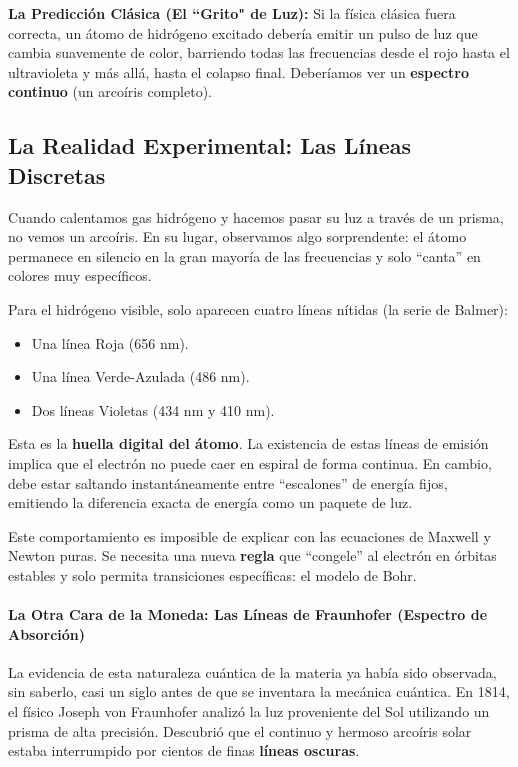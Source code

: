 \documentclass[11pt,a4paper]{book}
\begin{document}
\textbf{La Predicción Clásica (El ``Grito" de Luz):}
Si la física clásica fuera correcta, un átomo de hidrógeno excitado debería emitir un pulso de luz que cambia suavemente de color, barriendo todas las frecuencias desde el rojo hasta el ultravioleta y más allá, hasta el colapso final. Deberíamos ver un \textbf{espectro continuo} (un arcoíris completo).

\subsection{La Realidad Experimental: Las Líneas Discretas}

Cuando calentamos gas hidrógeno y hacemos pasar su luz a través de un prisma, no vemos un arcoíris. En su lugar, observamos algo sorprendente: el átomo permanece en silencio en la gran mayoría de las frecuencias y solo ``canta'' en colores muy específicos.

Para el hidrógeno visible, solo aparecen cuatro líneas nítidas (la serie de Balmer):
\begin{itemize}
    \item Una línea Roja (656 nm).
    \item Una línea Verde-Azulada (486 nm).
    \item Dos líneas Violetas (434 nm y 410 nm).
\end{itemize}

Esta es la \textbf{huella digital del átomo}. La existencia de estas líneas de emisión implica que el electrón no puede caer en espiral de forma continua. En cambio, debe estar saltando instantáneamente entre ``escalones'' de energía fijos, emitiendo la diferencia exacta de energía como un paquete de luz.

Este comportamiento es imposible de explicar con las ecuaciones de Maxwell y Newton puras. Se necesita una nueva \textbf{regla} que ``congele'' al electrón en órbitas estables y solo permita transiciones específicas: el modelo de Bohr.

\paragraph{La Otra Cara de la Moneda: Las Líneas de Fraunhofer (Espectro de Absorción)}

La evidencia de esta naturaleza cuántica de la materia ya había sido observada, sin saberlo, casi un siglo antes de que se inventara la mecánica cuántica. En 1814, el físico Joseph von Fraunhofer analizó la luz proveniente del Sol utilizando un prisma de alta precisión. Descubrió que el continuo y hermoso arcoíris solar estaba interrumpido por cientos de finas \textbf{líneas oscuras}. 
\end{document}
